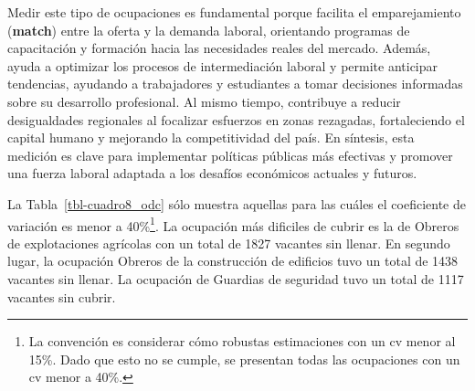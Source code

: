 \documentclass[
  11pt,
]{article}
\begin{document}
Medir este tipo de ocupaciones es fundamental porque facilita el
emparejamiento (\textbf{match}) entre la oferta y la demanda laboral,
orientando programas de capacitación y formación hacia las necesidades
reales del mercado. Además, ayuda a optimizar los procesos de
intermediación laboral y permite anticipar tendencias, ayudando a
trabajadores y estudiantes a tomar decisiones informadas sobre su
desarrollo profesional. Al mismo tiempo, contribuye a reducir
desigualdades regionales al focalizar esfuerzos en zonas rezagadas,
fortaleciendo el capital humano y mejorando la competitividad del país.
En síntesis, esta medición es clave para implementar políticas públicas
más efectivas y promover una fuerza laboral adaptada a los desafíos
económicos actuales y futuros.

La Tabla~\ref{tbl-cuadro8_odc} sólo muestra aquellas para las cuáles el
coeficiente de variación es menor a 40\%\footnote{La convención es
  considerar cómo robustas estimaciones con un cv menor al 15\%. Dado
  que esto no se cumple, se presentan todas las ocupaciones con un cv
  menor a 40\%.}. La ocupación más dificiles de cubrir es la de Obreros
de explotaciones agrícolas con un total de 1827 vacantes sin llenar. En
segundo lugar, la ocupación Obreros de la construcción de edificios tuvo
un total de 1438 vacantes sin llenar. La ocupación de Guardias de
seguridad tuvo un total de 1117 vacantes sin cubrir.
\end{document}
